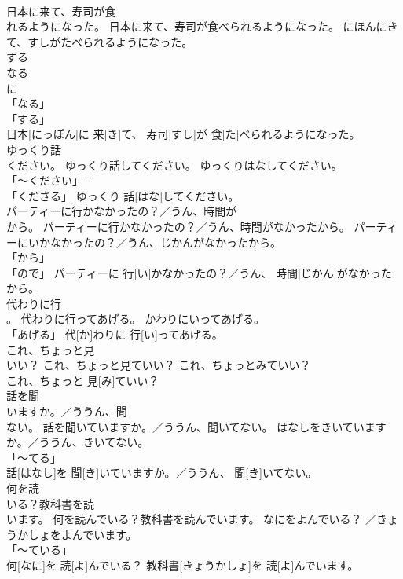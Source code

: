 \documentclass[8pt]{extreport}
\begin{document}
\begin{CJK}{UTF8}{min}
\\	日本に来て、寿司が食
\\	れるようになった。	日本に来て、寿司が食べられるようになった。	にほんにきて、すしがたべられるようになった。	
\\	する 
\\	なる 
\\	に 
\\	「なる」 
\\	「する」 
\\	日本[にっぽん]に 来[き]て、 寿司[すし]が 食[た]べられるようになった。		
\\	ゆっくり話
\\	ください。	ゆっくり話してください。	ゆっくりはなしてください。	
\\	「～ください」－ 
\\	「くださる」	ゆっくり 話[はな]してください。		
\\	パーティーに行かなかったの？／うん、時間が
\\	から。	パーティーに行かなかったの？／うん、時間がなかったから。	パーティーにいかなかったの？／うん、じかんがなかったから。	
\\	「から」 
\\	「ので」	パーティーに 行[い]かなかったの？／うん、 時間[じかん]がなかったから。		
\\	代わりに行
\\	。	代わりに行ってあげる。	かわりにいってあげる。	
\\	「あげる」	代[か]わりに 行[い]ってあげる。		
\\	これ、ちょっと見
\\	いい？	これ、ちょっと見ていい？	これ、ちょっとみていい？	
\\	これ、ちょっと 見[み]ていい？		
\\	話を聞
\\	いますか。／ううん、聞
\\	ない。	話を聞いていますか。／ううん、聞いてない。	はなしをきいていますか。／ううん、きいてない。	
\\	「～てる」 
\\	話[はなし]を 聞[き]いていますか。／ううん、 聞[き]いてない。		
\\	何を読
\\	いる？教科書を読
\\	います。	何を読んでいる？教科書を読んでいます。	なにをよんでいる？ ／きょうかしょをよんでいます。	
\\	「～ている」 
\\	何[なに]を 読[よ]んでいる？ 教科書[きょうかしょ]を 読[よ]んでいます。		

\end{CJK}
\end{document}
